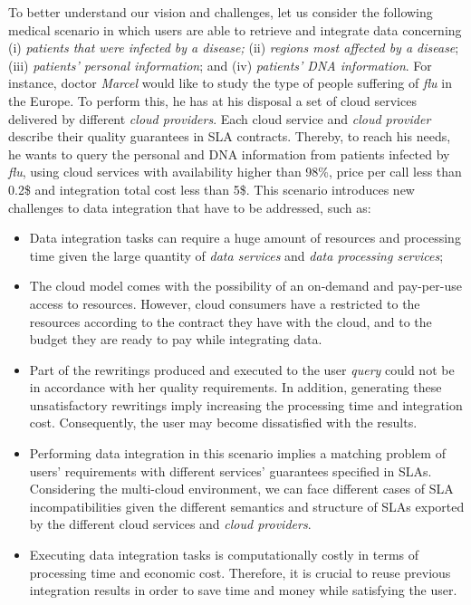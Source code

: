 To better understand our vision and challenges, let us consider the following medical scenario in which users are able to retrieve and integrate data concerning (i) \textit{patients that were infected by a disease;}
(ii) \textit{regions most affected by a disease}; (iii) \textit{patients' personal information}; and (iv) \textit{patients' DNA information}. For instance, doctor \textit{Marcel} would like to study the type of people suffering of \textit{flu} in the Europe. To perform this, he has at his disposal a set of cloud services delivered by different \textit{cloud providers}.
Each cloud service and \textit{cloud provider} describe their quality guarantees in SLA contracts. Thereby, to reach his needs, he wants to query the personal and DNA information from patients infected by \textit{flu}, using cloud services with availability higher than 98\%, price per call less than 0.2\$ and integration total cost less than 5\$. This scenario introduces new challenges to data integration that have to be addressed, such as:
\begin{itemize}
\item Data integration tasks can require a huge amount of resources and processing time given the large quantity of \textit{data services} and \textit{data processing services};
\item The cloud model comes with the possibility of an on-demand and pay-per-use access to resources. However, cloud consumers have a restricted to the resources according to the contract they have with the cloud, and to the budget they are ready to pay while integrating data.
\item Part of the rewritings produced and executed to the user \textit{query} could not be in accordance with her quality requirements. In addition, generating these unsatisfactory rewritings imply increasing  the processing time and integration cost. Consequently, the user may become dissatisfied with the results. 
\item Performing data integration in this scenario implies a matching problem of users' requirements with different services' guarantees specified in SLAs. Considering the multi-cloud environment, we can face different cases of SLA incompatibilities given the different semantics and structure of SLAs exported by the different cloud services and \textit{cloud providers}.
\item Executing data integration tasks is computationally costly in terms of processing time and economic cost. Therefore, it is crucial to reuse previous integration results in order to save time and money while satisfying the user.
\end{itemize}

